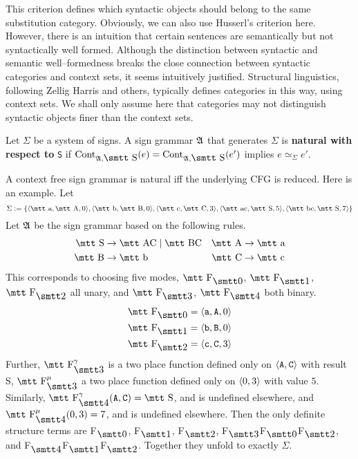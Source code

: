 This criterion defines which syntactic objects should belong 
to the same substitution category. Obviously, we can also use Husserl's 
criterion here. However, there is an intuition that certain sentences 
are semantically but not syntactically well formed. Although the distinction 
between syntactic and semantic well--formedness breaks the close 
connection between syntactic categories and context sets, it seems 
intuitively justified. Structural linguistics, following Zellig Harris
and others, typically defines categories in this way, using context sets.
We shall only assume here that categories may not distinguish syntactic
objects finer than the context sets. 
\begin{defn}
Let $\Sigma$ be a system of signs. A sign grammar $\mathfrak{A}$ that generates 
$\Sigma$ is \textbf{natural with respect to} {\tt S} if 
$\Cont_{\GA,\mbox{\smtt S}}(e) = \Cont_{\GA,\mbox{\smtt S}}(e')$ 
implies $e \simeq_{\Sigma} e'$.
\end{defn}
A context free sign grammar is natural iff the underlying CFG is 
reduced. Here is an example. Let 
\begin{equation}
\Sigma := \{\auf \mbox{\mtt a}, \mbox{\mtt A}, 0\zu, 
\auf \mbox{\mtt b}, \mbox{\mtt B}, 0\zu, 
\auf \mbox{\mtt c}, \mbox{\mtt C}, 3\zu, 
\auf \mbox{\mtt ac}, \mbox{\mtt S}, 5\zu, 
\auf \mbox{\mtt bc}, \mbox{\mtt S}, 7\zu\}
\end{equation}
Let $\mathfrak{A}$ be the sign grammar based on the following rules. 
\begin{align}
\mbox{\mtt S} & \pf \mbox{\mtt AC} \mid \mbox{\mtt BC} &
\mbox{\mtt A} & \pf \mbox{\mtt a} \\\notag
\mbox{\mtt B} & \pf \mbox{\mtt b} &
\mbox{\mtt C} & \pf \mbox{\mtt c}  
\end{align}
This corresponds to choosing five modes, $\mbox{\mtt F}_{\snull}$, 
$\mbox{\mtt F}_{\seins}$, $\mbox{\mtt F}_{\szwei}$ all unary, and
$\mbox{\mtt F}_{\sdrei}$, $\mbox{\mtt F}_{\svier}$ both binary.
\begin{align}
\notag
\mbox{\mtt F}_{\snull} & = \auf \mbox{\tt a}, \mbox{\tt A}, 0\zu \\ 
\mbox{\mtt F}_{\seins} & = \auf \mbox{\tt b}, \mbox{\tt B}, 0\zu \\ 
\notag
\mbox{\mtt F}_{\szwei} & = \auf \mbox{\tt c}, \mbox{\tt C}, 3\zu 
\end{align}
Further, $\mbox{\mtt F}_{\sdrei}^{\gamma}$ is a two place function 
defined only on $\langle \mbox{\tt A}, \mbox{\tt C}\rangle$ with result 
{\mtt S}, $\mbox{\mtt F}_{\sdrei}^{\mu}$ a two place function 
defined only on $\langle 0, 3\rangle$ with value $5$. Similarly, 
$\mbox{\mtt F}_{\svier}^{\gamma}(\mbox{\tt A}, \mbox{\tt C}) 
= \mbox{\mtt S}$, and is undefined elsewhere, and 
$\mbox{\mtt F}_{\svier}^{\mu}(0, 3) = 7$, and is undefined 
elsewhere. Then the only definite structure terms are 
{\mtt F$_{\snull}$}, {\mtt F$_{\seins}$}, {\mtt F$_{\szwei}$}, 
{\mtt F$_{\sdrei}$F$_{\snull}$F$_{\szwei}$}, 
and {\mtt F$_{\svier}$F$_{\seins}$F$_{\szwei}$}. Together they unfold 
to exactly $\Sigma$.

